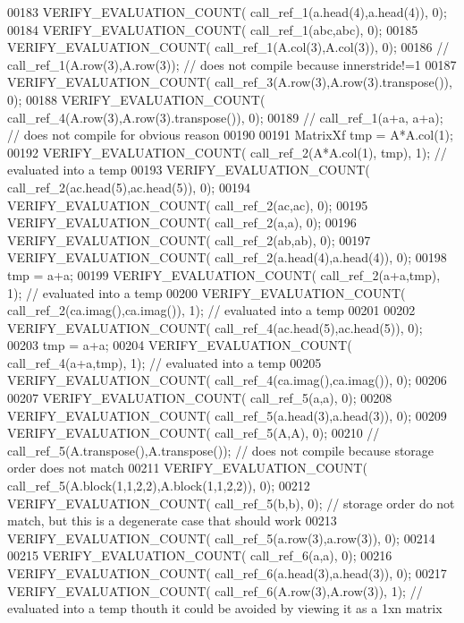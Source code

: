 \begin{DoxyCode}
00183   VERIFY\_EVALUATION\_COUNT( call\_ref\_1(a.head(4),a.head(4)), 0);
00184   VERIFY\_EVALUATION\_COUNT( call\_ref\_1(abc,abc), 0);
00185   VERIFY\_EVALUATION\_COUNT( call\_ref\_1(A.col(3),A.col(3)), 0);
00186 \textcolor{comment}{//   call\_ref\_1(A.row(3),A.row(3));    // does not compile because innerstride!=1}
00187   VERIFY\_EVALUATION\_COUNT( call\_ref\_3(A.row(3),A.row(3).transpose()), 0);
00188   VERIFY\_EVALUATION\_COUNT( call\_ref\_4(A.row(3),A.row(3).transpose()), 0);
00189 \textcolor{comment}{//   call\_ref\_1(a+a, a+a);          // does not compile for obvious reason}
00190 
00191   MatrixXf tmp = A*A.col(1);
00192   VERIFY\_EVALUATION\_COUNT( call\_ref\_2(A*A.col(1), tmp), 1);     \textcolor{comment}{// evaluated into a temp}
00193   VERIFY\_EVALUATION\_COUNT( call\_ref\_2(ac.head(5),ac.head(5)), 0);
00194   VERIFY\_EVALUATION\_COUNT( call\_ref\_2(ac,ac), 0);
00195   VERIFY\_EVALUATION\_COUNT( call\_ref\_2(a,a), 0);
00196   VERIFY\_EVALUATION\_COUNT( call\_ref\_2(ab,ab), 0);
00197   VERIFY\_EVALUATION\_COUNT( call\_ref\_2(a.head(4),a.head(4)), 0);
00198   tmp = a+a;
00199   VERIFY\_EVALUATION\_COUNT( call\_ref\_2(a+a,tmp), 1);            \textcolor{comment}{// evaluated into a temp}
00200   VERIFY\_EVALUATION\_COUNT( call\_ref\_2(ca.imag(),ca.imag()), 1);      \textcolor{comment}{// evaluated into a temp}
00201 
00202   VERIFY\_EVALUATION\_COUNT( call\_ref\_4(ac.head(5),ac.head(5)), 0);
00203   tmp = a+a;
00204   VERIFY\_EVALUATION\_COUNT( call\_ref\_4(a+a,tmp), 1);           \textcolor{comment}{// evaluated into a temp}
00205   VERIFY\_EVALUATION\_COUNT( call\_ref\_4(ca.imag(),ca.imag()), 0);
00206 
00207   VERIFY\_EVALUATION\_COUNT( call\_ref\_5(a,a), 0);
00208   VERIFY\_EVALUATION\_COUNT( call\_ref\_5(a.head(3),a.head(3)), 0);
00209   VERIFY\_EVALUATION\_COUNT( call\_ref\_5(A,A), 0);
00210 \textcolor{comment}{//   call\_ref\_5(A.transpose(),A.transpose());   // does not compile because storage order does not match}
00211   VERIFY\_EVALUATION\_COUNT( call\_ref\_5(A.block(1,1,2,2),A.block(1,1,2,2)), 0);
00212   VERIFY\_EVALUATION\_COUNT( call\_ref\_5(b,b), 0);             \textcolor{comment}{// storage order do not match, but this is a
       degenerate case that should work}
00213   VERIFY\_EVALUATION\_COUNT( call\_ref\_5(a.row(3),a.row(3)), 0);
00214 
00215   VERIFY\_EVALUATION\_COUNT( call\_ref\_6(a,a), 0);
00216   VERIFY\_EVALUATION\_COUNT( call\_ref\_6(a.head(3),a.head(3)), 0);
00217   VERIFY\_EVALUATION\_COUNT( call\_ref\_6(A.row(3),A.row(3)), 1);           \textcolor{comment}{// evaluated into a temp thouth it
       could be avoided by viewing it as a 1xn matrix}

\end{DoxyCode}
